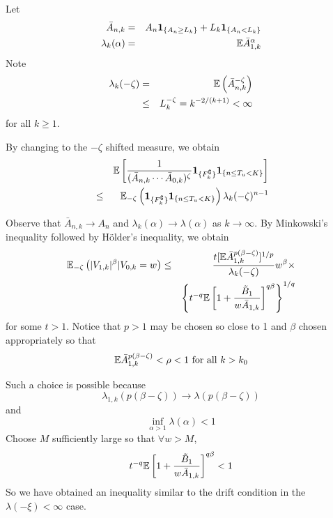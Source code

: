 \documentclass{beamer}
\begin{document}
\begin{frame}
  Let
  \begin{eqnarray*}
    \bar A_{n,k} &=& A_{n} \mathbf{1}_{\{A_n \geq L_k\}} + L_k \mathbf{1}_{\{A_n < L_k\}} \\
    \lambda_k(\alpha) &=& \mathbb{E} \bar A_{1,k}^\alpha
  \end{eqnarray*}
  Note
  \begin{eqnarray*}
    \lambda_k(-\zeta) &=& \mathbb{E} \left(\bar A_{n,k}^{-\zeta}\right) \\
    &\leq& L_k^{-\zeta} = k^{-2/(k+1)} < \infty
  \end{eqnarray*}
  for all $k \geq 1$.
  \end{frame}

  \begin{frame}
  By changing to the $-\zeta$ shifted measure, we obtain
  \begin{eqnarray*}
  && \mathbb{E} \left[
  {
    1\over
    (\bar A_{n,k} \cdots \bar A_{0,k})^\zeta
  } \mathbf{1}_{\{F_k^\complement\}} \mathbf{1}_{\{n \leq T_u < K\}} \right] \\
  &\leq&
  \mathbb{E}_{-\zeta}\left(\mathbf{1}_{\{F_k^\complement\}} \mathbf{1}_{\{n \leq T_u < K\}}\right)
  \lambda_k(-\zeta)^{n-1} 
  \end{eqnarray*}
\end{frame}

\begin{frame}
  Observe that $\bar A_{n,k} \to A_n$ and $\lambda_k(\alpha) \to
  \lambda(\alpha)$ as $k \to \infty$. By Minkowski's inequality
  followed by H\"older's inequality, we obtain
  \begin{eqnarray*}
    \mathbb{E}_{-\zeta} \left( |V_{1,k}|^\beta | V_{0,k} = w\right) &\leq& {
    t [\mathbb{E} \bar A_{1,k}^{p(\beta - \zeta)}]^{1/p}
    \over
    \lambda_k(-\zeta)
  } w^\beta \times \\
  && \left\{
    t^{-q} \mathbb{E} \left[
      1 + {
        \tilde B_1
        \over
        w \bar A_{1,k}
      }
    \right]^{q\beta}
  \right\}^{1/q}
  \end{eqnarray*}
  for some $t > 1$. Notice that $p > 1$ may be chosen so close to 1
  and $\beta$ chosen appropriately so that
  \[
  \mathbb{E} \bar A_{1,k}^{p(\beta - \zeta)} < \rho < 1 \text{ for all } k > k_0
  \]
\end{frame}

\begin{frame}
  Such a choice is possible because
  \[
  \lambda_{1,k}(p(\beta - \zeta))
  \to \lambda(p(\beta - \zeta))
  \]
  and
  \[
  \inf_{\alpha > 1} \lambda(\alpha) < 1
  \]
  Choose $M$ sufficiently large so that $\forall w > M$,
  \[
    t^{-q} \mathbb{E} \left[
      1 + {
        \tilde B_1
        \over
        w \bar A_{1,k}
      }
    \right]^{q\beta} < 1
  \]
  So we have obtained an inequality similar to the drift condition in
  the $\lambda(-\xi) < \infty$ case.
\end{frame}
\end{document}
